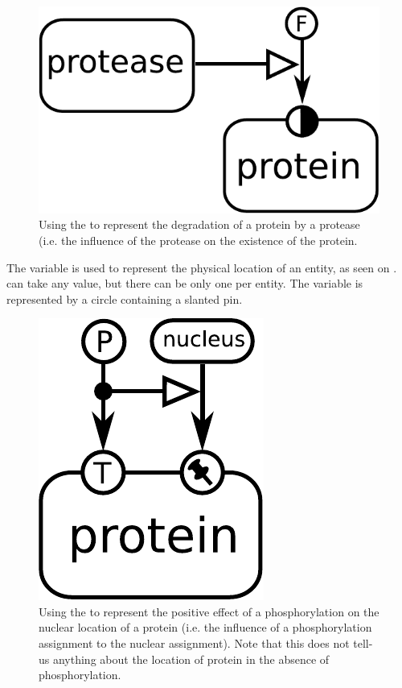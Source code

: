 \begin{figure}[H]
  \centering
  \includegraphics[scale = 0.5]{examples/existence-degradation}
  \caption{Using the   to represent the degradation of a protein by a protease (i.e. the influence of the protease on the existence of the protein.}
  \label{fig:existence}
\end{figure}

The variable  is used to represent the physical location of an entity, as seen on \label{sec:location}.  can take any value, but there can be only one  per entity. The variable is represented by a circle containing a slanted pin.

\begin{figure}[H]
  \centering
  \includegraphics[scale = 0.5]{examples/location-phosphorylation}
  \caption{Using the   to represent the positive effect of a phosphorylation on the nuclear location of a protein (i.e. the influence of a phosphorylation assignment to the nuclear assignment). Note that this does not tell-us anything about the location of protein in the absence of phosphorylation.}
  \label{fig:location}
\end{figure}

\normalcolor


